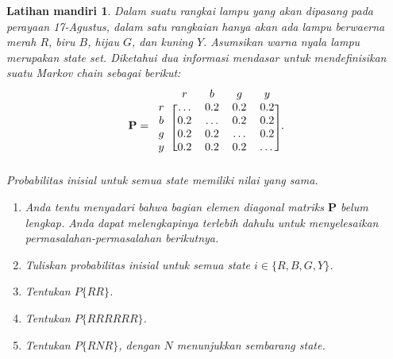 \documentclass[11pt,b5paper,twoside]{book}
\newtheorem{test}[theorem]{Latihan mandiri}
\begin{document}
	\begin{test} \label{lampu1}
	Dalam suatu rangkai lampu yang akan dipasang pada perayaan 17-Agustus, dalam satu rangkaian hanya akan ada lampu berwaerna merah $R$, biru $B$, hijau $G$, dan kuning $Y$. Asumsikan warna nyala lampu merupakan state set. Diketahui dua informasi mendasar untuk mendefinisikan suatu Markov chain sebagai berikut:
	$$
	\mathbf{P}=
	\begin{blockarray}{l *{4}{c}}
	& r & b & g & y \\
	\begin{block}{c[cccc]}
	r& \dots & 0.2 & 0.2 & 0.2 \\
	b&  0.2 & \dots & 0.2 & 0.2 \\
	g&  0.2 & 0.2 & \dots & 0.2 \\
	y&  0.2& 0.2 & 0.2 &\dots \\
	\end{block}
	\end{blockarray}.
	$$
	Probabilitas inisial untuk semua state memiliki nilai yang sama.
	\begin{enumerate}
		\item Anda tentu menyadari bahwa bagian elemen diagonal matriks $\mathbf{P}$ belum lengkap. Anda dapat melengkapinya terlebih dahulu untuk menyelesaikan permasalahan-permasalahan berikutnya.
		\item Tuliskan probabilitas inisial untuk semua state $i \in \{R,B,G,Y\}$.
		\item Tentukan $P\{RR\}$.		
		\item Tentukan $P\{RRRRRR\}$.		
		\item Tentukan $P\{RNR\}$, dengan $N$ menunjukkan sembarang state.		

	\end{enumerate}
	\end{test}

	\begin{center}
	\end{center}
\end{document}
